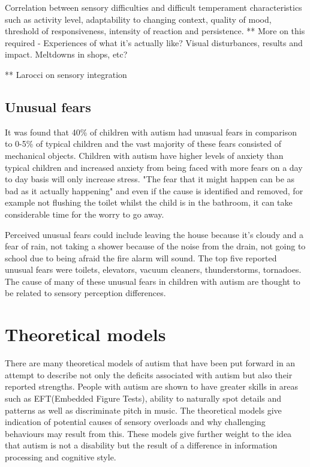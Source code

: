 \documentclass[11pt]{report}
\begin{document}
Correlation between sensory difficulties and difficult temperament characteristics such as activity level, adaptability to changing context, quality of mood, threshold of responsiveness, intensity of reaction and persistence\cite{temperament}. ** More on this required - Experiences of what it's actually like? Visual disturbances, results and impact. Meltdowns in shops, etc?

** Larocci on sensory integration

\subsection{Unusual fears}

It was found that 40\% of children with autism had unusual fears in comparison to 0-5\% of typical children and the vast majority of these fears consisted of mechanical objects. Children with autism have higher levels of anxiety than typical children\cite{fears} and increased anxiety from being faced with more fears on a day to day basis will only increase stress. "The fear that it might happen can be as bad as it actually happening" and even if the cause is identified and removed, for example not flushing the toilet whilst the child is in the bathroom, it can take considerable time for the worry to go away.

Perceived unusual fears could include leaving the house because it's cloudy and a fear of rain, not taking a shower because of the noise from the drain, not going to school due to being afraid the fire alarm will sound. The top five reported unusual fears were toilets, elevators, vacuum cleaners, thunderstorms, tornadoes. The cause of many of these unusual fears in children with autism are thought to be related to sensory perception differences\cite{fears}.

\section{Theoretical models}
There are many theoretical models of autism that have been put forward in an attempt to describe not only the deficits associated with autism but also their reported strengths. People with autism are shown to have greater skills in areas such as EFT(Embedded Figure Tests), ability to naturally spot details and patterns as well as discriminate pitch in music. The theoretical models give indication of potential causes of sensory overloads and why challenging behaviours may result from this. These models give further weight to the idea that autism is not a disability but the result of a difference in information processing and cognitive style. 
\end{document}
